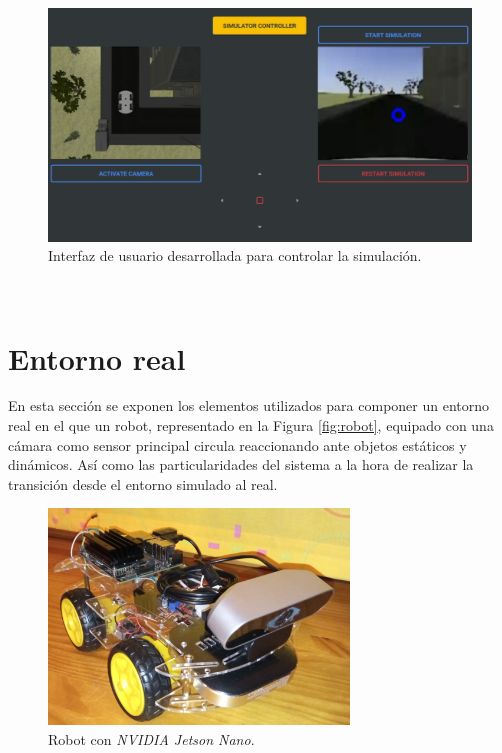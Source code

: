 \begin{figure} [h!]
	\begin{center}
		\includegraphics[width=14cm]{figs/GUI}
	\end{center}
	\caption{Interfaz de usuario desarrollada para controlar la simulación.}
	\label{fig:gui}
\end{figure}\

\section{Entorno real}
\label{section:real}
En esta sección se exponen los elementos utilizados para componer un entorno real en el que un robot, representado en la Figura \ref{fig:robot}, equipado con una cámara como sensor principal circula reaccionando ante objetos estáticos y dinámicos. Así como las particularidades del sistema a la hora de realizar la transición desde el entorno simulado al real.\\

\begin{figure} [h!]
	\begin{center}
		\includegraphics[width=8cm]{figs/robot}
	\end{center}
	\caption{Robot con \textit{NVIDIA Jetson Nano}.}
	\label{fig:realrobot}
\end{figure}\

